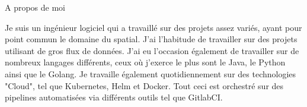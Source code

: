 \documentclass[
	11pt, %
]{resume} %
\begin{document}

\begin{rSection}{A propos de moi}
 
	Je suis un ingénieur logiciel qui a travaillé sur des projets assez variés, ayant pour point commun le domaine du spatial. 
	J'ai l'habitude de travailler sur des projets utilisant de gros flux de données. 
	J'ai eu l'occasion également de travailler sur de nombreux langages différents, ceux où j'exerce le plus sont le Java, le Python ainsi que le Golang. 
	Je travaille également quotidiennement sur des technologies "Cloud", tel que Kubernetes, Helm et Docker. 
	Tout ceci est orchestré sur des pipelines automatisées via différents outils tel que GitlabCI. 

\end{rSection}
\end{document}

